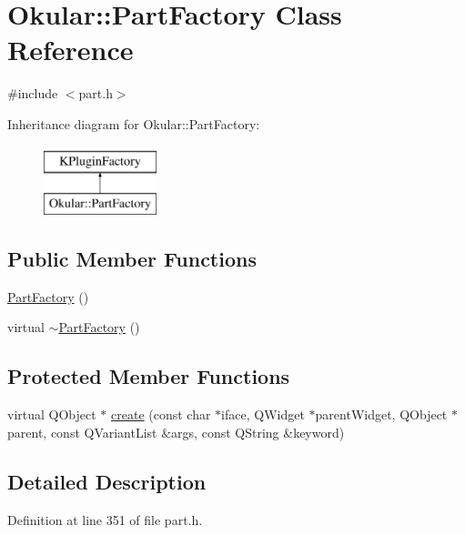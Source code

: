 \hypertarget{classOkular_1_1PartFactory}{\section{Okular\+:\+:Part\+Factory Class Reference}
\label{classOkular_1_1PartFactory}
}


{\ttfamily \#include $<$part.\+h$>$}

Inheritance diagram for Okular\+:\+:Part\+Factory\+:\begin{figure}[H]
\begin{center}
\leavevmode
\includegraphics[height=2.000000cm]{classOkular_1_1PartFactory}
\end{center}
\end{figure}
\subsection*{Public Member Functions}
\begin{DoxyCompactItemize}
\item 
\hyperlink{classOkular_1_1PartFactory_a1b7549539fdbf04599e41ca8ef8e4da0}{Part\+Factory} ()
\item 
virtual \hyperlink{classOkular_1_1PartFactory_a128d4ba13c4325b7f16f5cc7e459054a}{$\sim$\+Part\+Factory} ()
\end{DoxyCompactItemize}
\subsection*{Protected Member Functions}
\begin{DoxyCompactItemize}
\item 
virtual Q\+Object $\ast$ \hyperlink{classOkular_1_1PartFactory_a48fcf03bb384683a15fc6ad3bb295106}{create} (const char $\ast$iface, Q\+Widget $\ast$parent\+Widget, Q\+Object $\ast$parent, const Q\+Variant\+List \&args, const Q\+String \&keyword)
\end{DoxyCompactItemize}


\subsection{Detailed Description}


Definition at line 351 of file part.\+h.



